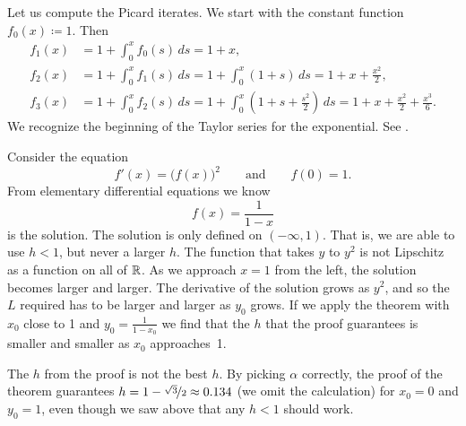 \begin{example}
Let us compute the Picard iterates.
We start with the constant function $f_0(x) \coloneqq 1$.  Then
\begin{align*}
f_1(x) & = 1 + \int_0^x f_0(s)\,ds =
1+x, \\
f_2(x) & = 1 + \int_0^x f_1(s)\,ds =
1 + \int_0^x (1+s)\,ds = 1 + x + \frac{x^2}{2}, \\
f_3(x) & = 1 + \int_0^x f_2(s)\,ds =
1 + \int_0^x \left(1+ s + \frac{s^2}{2} \right)\,ds =
1 + x + \frac{x^2}{2} + \frac{x^3}{6} .
\end{align*}
We recognize the beginning of the Taylor series for the exponential.
See .
\begin{myfigureht}
\caption{The exponential (solid line) together with $f_0$, $f_1$, $f_2$,
$f_3$ (dashed).\label{fig:exppicard}}
\end{myfigureht}
\end{example}

\begin{example}
Consider the equation
\begin{equation*}
f'(x) = {\bigl(f(x)\bigr)}^2 \qquad \text{and} \qquad f(0)=1.
\end{equation*}
From elementary differential equations we know 
\begin{equation*}
f(x) = \frac{1}{1-x}
\end{equation*}
is the solution.
The solution is only defined on $(-\infty,1)$.  That is,
we are able to use $h < 1$, but never a larger $h$.
The function that takes $y$ to $y^2$ is
not Lipschitz as a function on all of ${\mathbb{R}}$.
As we approach $x=1$ from the left, the solution becomes larger
and larger.  The derivative of the solution grows as $y^2$, and so
the $L$ required has to be larger and larger as $y_0$ grows.
If we apply the
theorem with $x_0$ close to 1 and $y_0 = \frac{1}{1-x_0}$ we find
that the $h$ that the proof guarantees is smaller and smaller as $x_0$
approaches~1.

The $h$ from the proof is not the best $h$.
By picking $\alpha$ correctly, the proof of the theorem guarantees
$h=1-\nicefrac{\sqrt{3}}{2} \approx 0.134$ (we omit the
calculation) for $x_0=0$ and $y_0=1$, even though
we saw above that any $h < 1$ should work.
\end{example}

